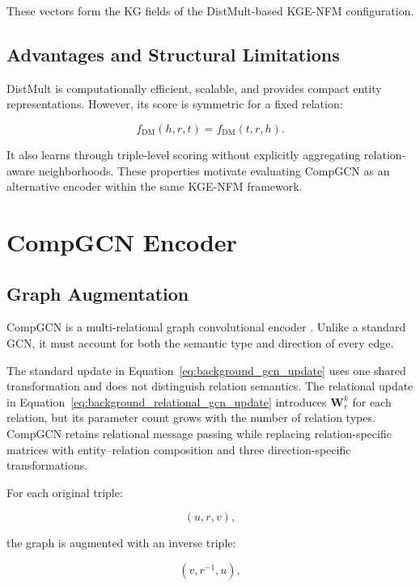 These vectors form the KG fields of the DistMult-based KGE-NFM configuration.

\subsection{Advantages and Structural Limitations}

DistMult is computationally efficient, scalable, and provides compact entity
representations. However, its score is symmetric for a fixed relation:

\begin{equation}
    f_{\mathrm{DM}}(h,r,t)
    =
    f_{\mathrm{DM}}(t,r,h).
\end{equation}

It also learns through triple-level scoring without explicitly aggregating
relation-aware neighborhoods. These properties motivate evaluating CompGCN as
an alternative encoder within the same KGE-NFM framework.

\section{CompGCN Encoder}

\subsection{Graph Augmentation}

CompGCN is a multi-relational graph convolutional encoder
\cite{VashishthSNT20}. Unlike a standard GCN, it must account for
both the semantic type and direction of every edge.

The standard update in Equation~\ref{eq:background_gcn_update} uses one shared
transformation and does not distinguish relation semantics. The relational
update in Equation~\ref{eq:background_relational_gcn_update} introduces
$\mathbf{W}_{r}^{k}$ for each relation, but its parameter count grows with the
number of relation types. CompGCN retains relational message passing while
replacing relation-specific matrices with entity--relation composition and
three direction-specific transformations.

For each original triple:

\begin{equation}
    (u,r,v),
\end{equation}

the graph is augmented with an inverse triple:

\begin{equation}
    (v,r^{-1},u),
\end{equation}


